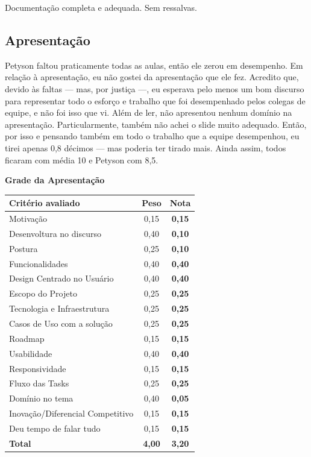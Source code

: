 \documentclass[
  sigconf,
  nonacm, %
  language=portuguese
]{acmart}
\newcommand{\statuswarn}[1]{{\small\bfseries\color{cwarn}#1}}
\newcommand{\gmax}[1]{{\color{cgood}\textbf{#1}}}
\newcommand{\gcut}[1]{{\color{cwarn}\textbf{#1}}}
\begin{document}
Documentação completa e adequada. Sem ressalvas.

\subsection{Apresentação}
\noindent\statuswarn{3,20\,/\,4,00 pts · Com ressalvas}

Petyson faltou praticamente todas as aulas, então ele zerou em desempenho. Em relação à apresentação, eu não gostei da apresentação que ele fez. Acredito que, devido às faltas --- mas, por justiça ---, eu esperava pelo menos um bom discurso para representar todo o esforço e trabalho que foi desempenhado pelos colegas de equipe, e não foi isso que vi. Além de ler, não apresentou nenhum domínio na apresentação. Particularmente, também não achei o slide muito adequado. Então, por isso e pensando também em todo o trabalho que a equipe desempenhou, eu tirei apenas 0,8 décimos --- mas poderia ter tirado mais. Ainda assim, todos ficaram com média 10 e Petyson com 8,5.

\par\medskip\noindent\textbf{Grade da Apresentação}\par\smallskip

{\small
{}
\begin{tabularx}{\linewidth}{@{} >{\raggedright\arraybackslash}X c c @{}}
\toprule
\textbf{Critério avaliado} & \textbf{Peso} & \textbf{Nota} \\
\midrule
Motivação & 0,15 & \gmax{0,15} \\
Desenvoltura no discurso & 0,40 & \gcut{0,10} \\
Postura & 0,25 & \gcut{0,10} \\
Funcionalidades & 0,40 & \gmax{0,40} \\
Design Centrado no Usuário & 0,40 & \gmax{0,40} \\
Escopo do Projeto & 0,25 & \gmax{0,25} \\
Tecnologia e Infraestrutura & 0,25 & \gmax{0,25} \\
Casos de Uso com a solução & 0,25 & \gmax{0,25} \\
Roadmap & 0,15 & \gmax{0,15} \\
Usabilidade & 0,40 & \gmax{0,40} \\
Responsividade & 0,15 & \gmax{0,15} \\
Fluxo das Tasks & 0,25 & \gmax{0,25} \\
Domínio no tema & 0,40 & \gcut{0,05} \\
Inovação/Diferencial Competitivo & 0,15 & \gmax{0,15} \\
Deu tempo de falar tudo & 0,15 & \gmax{0,15} \\
\midrule
\textbf{Total} & \textbf{4,00} & \textbf{\color{cred}3,20} \\
\bottomrule
\end{tabularx}}
\end{document}
